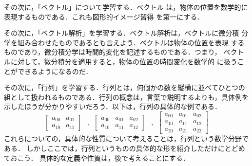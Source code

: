             その次に，「ベクトル」について学習する．ベクトル
            は，物体の位置を数学的に表現するものである．これも図形的イメージ習得
            を第一にする．

            その次に，「ベクトル解析」を学習する．ベクトル解析は，ベクトルに微分積
            分学を組み合わせたものであるとも言えよう．ベクトルは物体の位置を表現
            するものであり，微分積分学は時間的変化を記述するものである．つまり，
            ベクトルに対して，微分積分を適用すると，物体の位置の時間変化を数学的
            に扱うことができるようになるのだ．

            その次に，「行列」を学習する．行列とは，何個かの数を縦横に並べてひとつの
            組として扱われるものである．行列の概念は，言葉で説明するよりも，具体例を
            示したほうが分かりやすいだろう．以下は，行列の具体的な例である．
            \begin{equation*}
                \begin{bmatrix}
                    a_{00} & a_{01} \\
                    a_{10} & a_{11}
                \end{bmatrix}
                \;\;\;,\,\;
                \begin{bmatrix}
                    a_{00} & a_{01} & a_{02} \\
                    a_{10} & a_{11} & a_{12}
                \end{bmatrix}
                \;\;\;,\,\;
                \begin{bmatrix}
                    a_{00} & a_{01} & a_{02} \\
                    a_{10} & a_{11} & a_{12} \\
                    a_{20} & a_{21} & a_{22}
                \end{bmatrix}
            \end{equation*}
            これらについての，具体的な性質について考えることは，行列という数学分野である．
            しかしここでは，行列というものの具体的な形を紹介しただけにとどめておこう．
            具体的な定義や性質は，後で考えることにする．
